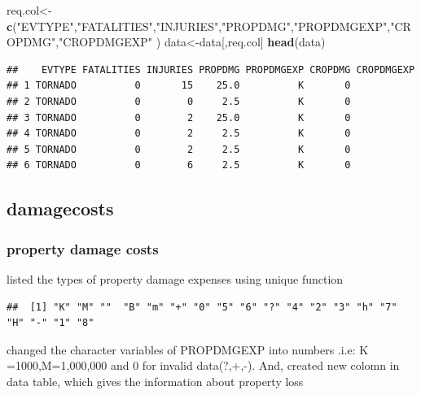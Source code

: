 \documentclass[
]{article}
\newenvironment{Shaded}{\begin{snugshade}}{\end{snugshade}}
\newcommand{\KeywordTok}[1]{\textcolor[rgb]{0.13,0.29,0.53}{\textbf{#1}}}
\newcommand{\NormalTok}[1]{#1}
\newcommand{\OperatorTok}[1]{\textcolor[rgb]{0.81,0.36,0.00}{\textbf{#1}}}
\newcommand{\StringTok}[1]{\textcolor[rgb]{0.31,0.60,0.02}{#1}}
\begin{document}
\begin{Shaded}
\begin{Highlighting}[]
\NormalTok{req.col<-}\KeywordTok{c}\NormalTok{(}\StringTok{"EVTYPE"}\NormalTok{,}\StringTok{"FATALITIES"}\NormalTok{,}\StringTok{"INJURIES"}\NormalTok{,}\StringTok{"PROPDMG"}\NormalTok{,}\StringTok{"PROPDMGEXP"}\NormalTok{,}\StringTok{"CROPDMG"}\NormalTok{,}\StringTok{"CROPDMGEXP"}\NormalTok{ )}
\NormalTok{data<-data[,req.col]}
\KeywordTok{head}\NormalTok{(data)}
\end{Highlighting}
\end{Shaded}

\begin{verbatim}
##    EVTYPE FATALITIES INJURIES PROPDMG PROPDMGEXP CROPDMG CROPDMGEXP
## 1 TORNADO          0       15    25.0          K       0           
## 2 TORNADO          0        0     2.5          K       0           
## 3 TORNADO          0        2    25.0          K       0           
## 4 TORNADO          0        2     2.5          K       0           
## 5 TORNADO          0        2     2.5          K       0           
## 6 TORNADO          0        6     2.5          K       0
\end{verbatim}

\hypertarget{damagecosts}{%
\subsection{damagecosts}\label{damagecosts}}

\hypertarget{property-damage-costs}{%
\subsubsection{property damage costs}\label{property-damage-costs}}

listed the types of property damage expenses using unique function

\begin{Shaded}
\end{Shaded}

\begin{verbatim}
##  [1] "K" "M" ""  "B" "m" "+" "0" "5" "6" "?" "4" "2" "3" "h" "7" "H" "-" "1" "8"
\end{verbatim}

changed the character variables of PROPDMGEXP into numbers .i.e: K
=1000,M=1,000,000 and 0 for invalid data(?,+,-). And, created new colomn
in data table, which gives the information about property loss
\end{document}
